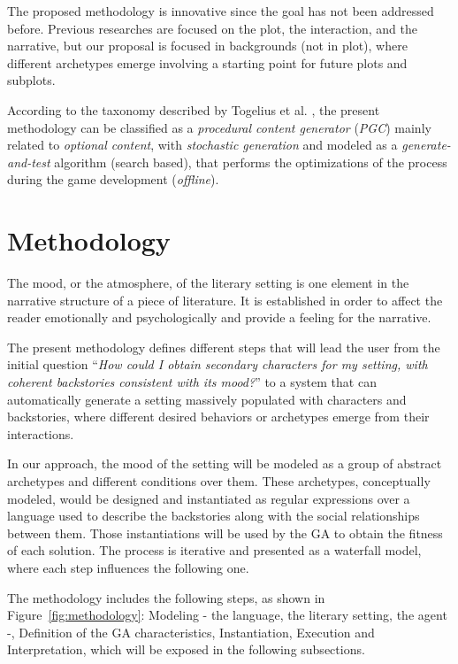 \documentclass[letterpaper]{article}
\begin{document}
The proposed methodology is innovative since the goal has not been addressed before. Previous researches are focused on the plot, the interaction, and the narrative, but our proposal is focused in backgrounds (not in plot), where different archetypes emerge involving a starting point for future plots and subplots.


According to the taxonomy described by Togelius et al. \citep{Togelius2011}, the present methodology can be classified as a \textit{procedural content generator} (\textit{PGC})
mainly related to \textit{optional content}, with \textit{stochastic generation}
and modeled as a \textit{generate-and-test} algorithm (search based), that
performs the optimizations of the process during the game development (\textit{offline}).


%
%

\section{Methodology}
\label{sec:methodology}

The mood, or the atmosphere, of the literary setting is one element in the narrative structure of a piece of literature. It is established in order to affect the reader emotionally and psychologically and provide a feeling for the narrative.


The present methodology defines different steps that will lead the user from the initial question ``\textit{How could I obtain secondary characters for my setting, with coherent backstories consistent with its mood?}'' to a system that can automatically generate a setting massively populated with characters and backstories, where different desired behaviors or archetypes emerge from their interactions.

In our approach, the mood of the setting will be modeled as a group of abstract archetypes and different conditions over them. These archetypes, conceptually modeled, would be designed and instantiated as regular expressions over a language used to describe the backstories along with the social relationships between them. Those instantiations will be used by the GA to obtain the fitness of each solution. The process is iterative and presented as a waterfall model, where each step influences the following one.

The methodology includes the following steps, as shown in Figure~\ref{fig:methodology}: Modeling - the language, the literary setting, the agent -, Definition of the GA characteristics, Instantiation, Execution and Interpretation, which will be exposed in the following subsections.
\end{document}
